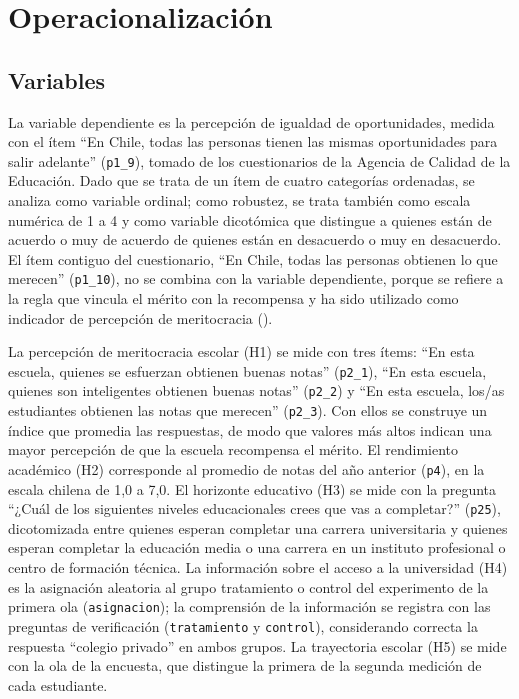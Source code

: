 \documentclass[
  spanish,
  a4paper,
  oneside]{scrbook}
\begin{document}
\section{Operacionalización}\label{operacionalizaciuxf3n}

\subsection{Variables}\label{variables}

La variable dependiente es la percepción de igualdad de oportunidades,
medida con el ítem ``En Chile, todas las personas tienen las mismas
oportunidades para salir adelante'' (\texttt{p1\_9}), tomado de los
cuestionarios de la Agencia de Calidad de la Educación. Dado que se
trata de un ítem de cuatro categorías ordenadas, se analiza como
variable ordinal; como robustez, se trata también como escala numérica
de 1 a 4 y como variable dicotómica que distingue a quienes están de
acuerdo o muy de acuerdo de quienes están en desacuerdo o muy en
desacuerdo. El ítem contiguo del cuestionario, ``En Chile, todas las
personas obtienen lo que merecen'' (\texttt{p1\_10}), no se combina con
la variable dependiente, porque se refiere a la regla que vincula el
mérito con la recompensa y ha sido utilizado como indicador de
percepción de meritocracia
().

La percepción de meritocracia escolar (H1) se mide con tres ítems: ``En
esta escuela, quienes se esfuerzan obtienen buenas notas''
(\texttt{p2\_1}), ``En esta escuela, quienes son inteligentes obtienen
buenas notas'' (\texttt{p2\_2}) y ``En esta escuela, los/as estudiantes
obtienen las notas que merecen'' (\texttt{p2\_3}). Con ellos se
construye un índice que promedia las respuestas, de modo que valores más
altos indican una mayor percepción de que la escuela recompensa el
mérito. El rendimiento académico (H2) corresponde al promedio de notas
del año anterior (\texttt{p4}), en la escala chilena de 1,0 a 7,0. El
horizonte educativo (H3) se mide con la pregunta ``¿Cuál de los
siguientes niveles educacionales crees que vas a completar?''
(\texttt{p25}), dicotomizada entre quienes esperan completar una carrera
universitaria y quienes esperan completar la educación media o una
carrera en un instituto profesional o centro de formación técnica. La
información sobre el acceso a la universidad (H4) es la asignación
aleatoria al grupo tratamiento o control del experimento de la primera
ola (\texttt{asignacion}); la comprensión de la información se registra
con las preguntas de verificación (\texttt{tratamiento} y
\texttt{control}), considerando correcta la respuesta ``colegio
privado'' en ambos grupos. La trayectoria escolar (H5) se mide con la
ola de la encuesta, que distingue la primera de la segunda medición de
cada estudiante.
\end{document}

